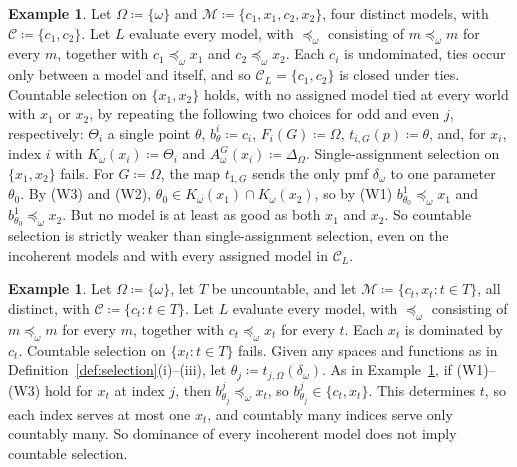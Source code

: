 \documentclass[11pt]{article}
\theoremstyle{definition}
\newtheorem{example}[theorem]{Example}
\theoremstyle{remark}
\newcommand{\M}{\mathcal M}
\newcommand{\C}{\mathcal C}
\begin{document}
\begin{example}\label{ex:two-pairs}
Let $\Omega\coloneqq\{\omega\}$ and $\M\coloneqq\{c_1,x_1,c_2,x_2\}$, four distinct models, with $\C\coloneqq\{c_1,c_2\}$. Let $L$ evaluate every model, with $\preceq_\omega$ consisting of $m\preceq_\omega m$ for every $m$, together with $c_1\preceq_\omega x_1$ and $c_2\preceq_\omega x_2$. Each $c_i$ is undominated, ties occur only between a model and itself, and so $\C_L=\{c_1,c_2\}$ is closed under ties. {\color{red}Countable selection on $\{x_1,x_2\}$ holds, with no assigned model tied at every world with $x_1$ or $x_2$, by} repeating the following two choices for odd and even $j$, respectively: $\Theta_i$ a single point $\theta$, $b^i_\theta\coloneqq c_i$, $F_i(G)\coloneqq\Omega$, $t_{i,G}(p)\coloneqq\theta$, and, for $x_i$, index $i$ with $K_\omega(x_i)\coloneqq\Theta_i$ and $A^G_\omega(x_i)\coloneqq\Delta_\Omega$. Single-assignment selection on $\{x_1,x_2\}$ fails. For $G\coloneqq\Omega$, the map $t_{1,G}$ sends the only pmf $\delta_\omega$ to one parameter $\theta_0$. By (W3) and (W2), $\theta_0\in K_\omega(x_1)\cap K_\omega(x_2)$, so by (W1) $b^1_{\theta_0}\preceq_\omega x_1$ and $b^1_{\theta_0}\preceq_\omega x_2$. But no model is at least as good as both $x_1$ and $x_2$. So countable selection is strictly weaker than single-assignment selection, even on the incoherent models and with every assigned model in $\C_L$.
\end{example}

\begin{example}\label{ex:uncountable}
Let $\Omega\coloneqq\{\omega\}$, let $T$ be uncountable, and let $\M\coloneqq\{c_t,x_t:t\in T\}$, all distinct, with $\C\coloneqq\{c_t:t\in T\}$. Let $L$ evaluate every model, with $\preceq_\omega$ consisting of $m\preceq_\omega m$ for every $m$, together with $c_t\preceq_\omega x_t$ for every $t$. Each $x_t$ is dominated by $c_t$. Countable selection on $\{x_t:t\in T\}$ fails. Given any spaces and functions as in Definition~\ref{def:selection}(i)--(iii), let $\theta_j\coloneqq t_{j,\Omega}(\delta_\omega)$. As in Example~\ref{ex:two-pairs}, if (W1)--(W3) hold for $x_t$ at index $j$, then $b^j_{\theta_j}\preceq_\omega x_t$, so $b^j_{\theta_j}\in\{c_t,x_t\}$. This determines $t$, so each index serves at most one $x_t$, and countably many indices serve only countably many. So dominance of every incoherent model does not imply countable selection.
\end{example}
\end{document}
